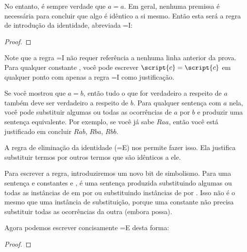 No entanto, é sempre verdade que $a=a$. Em geral, nenhuma premissa é necessária para concluir que algo é idêntico a si mesmo. Então esta será a regra de introdução da identidade, abreviada {=}I:

\begin{proof}
	 
\end{proof}

Note que a regra {=}I não requer referência a nenhuma linha anterior da prova. Para qualquer constante , você pode escrever $\script{c}=\script{c}$ em qualquer ponto com apenas a regra {=}I como justificação.

Se você mostrou que $a=b$, então tudo o que for verdadeiro a respeito de $a$ também deve ser verdadeiro a respeito de $b$. Para qualquer sentença com $a$ nela, você pode substituir algumas ou todas as ocorrências de $a$ por $b$ e produzir uma sentença equivalente. Por exemplo, se você já sabe $Raa$, então você está justificado em concluir $Rab$, $Rba$, $Rbb$.


A regra de eliminação da identidade ({=}E) nos permite fazer isso. Ela justifica substituir termos por outros termos que são idênticos a ele.

Para escrever a regra, introduziremos um novo bit de simbolismo. Para uma sentença  e constantes  e ,  é uma sentença produzida substituindo algumas ou todas as instâncias de  em  por  ou substituindo instâncias de  por . Isso não é o mesmo que uma instância de substituição, porque uma constante não precisa substituir todas as ocorrências da outra (embora possa).

Agora podemos escrever concisamente {=}E desta forma:
\begin{proof}
	 
\end{proof}
\nopagebreak





